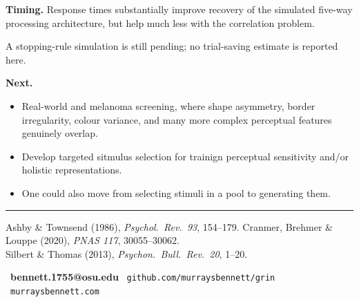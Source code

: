 \documentclass[final]{article}
\newlength{\colw}
\begin{document}
\hfill
\begin{minipage}[t]{\colw}

\begin{callout}
\textbf{Timing.} Response times substantially improve recovery of the simulated
five-way processing architecture, but help much less with the correlation problem.
\end{callout}

{\bodyfont A stopping-rule simulation is still pending; no trial-saving estimate
is reported here.}



\begin{callout}
\textbf{Next.} 
\begin{itemize}
	\item Real-world and melanoma screening, where shape asymmetry, border irregularity, colour variance, and many more complex perceptual features genuinely overlap.
	\item Develop targeted sitmulus selection for trainign perceptual sensitivity and/or holistic representations. 
	\item One could also move from selecting stimuli in a pool to generating them.
\end{itemize}
\end{callout}

\end{minipage}


\vfill
{\color{gmute}\rule{\textwidth}{2pt}}
\vspace{0.05in}

\noindent
\begin{minipage}[t]{0.6\textwidth}
\setlength{\parskip}{0pt}%
{\color{gink}
Ashby \& Townsend (1986), \emph{Psychol.\ Rev.\ 93}, 154--179. \quad
Cranmer, Brehmer \& Louppe (2020), \emph{PNAS 117}, 30055--30062. \\[0.03in]
Silbert \& Thomas (2013), \emph{Psychon.\ Bull.\ Rev.\ 20}, 1--20.
\par}
\end{minipage}%
\hfill
\begin{minipage}[t]{0.4\textwidth}
\setlength{\parskip}{0pt}%
\raggedleft
{\smallfont\color{gink}
\faEnvelope\ \textbf{bennett.1755@osu.edu} \quad
\faGithub\ \texttt{github.com/murraysbennett/grin} \quad
\faGlobe\ \texttt{murraysbennett.com}
\par}
\end{minipage}
\end{document}
